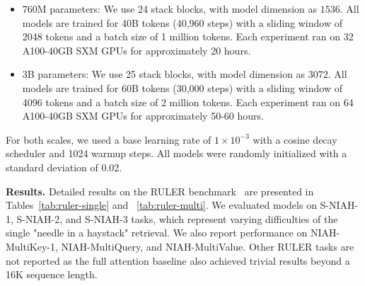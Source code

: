 \documentclass{article}
\begin{document}
\begin{itemize}
    \item 760M parameters: We use 24 stack blocks, with model dimension as $1536$. All models are trained for 40B tokens (40,960 steps) with a sliding window of 2048 tokens and a batch size of 1 million tokens. Each experiment ran on 32 A100-40GB SXM GPUs for approximately 20 hours.
    \item 3B parameters: We use 25 stack blocks, with model dimension as $3072$. All models are trained for 60B tokens (30,000 steps) with a sliding window of 4096 tokens and a batch size of 2 million tokens. Each experiment ran on 64 A100-40GB SXM GPUs for approximately 50-60 hours.
\end{itemize}
For both scales, we used a base learning rate of $1\times 10^{-3}$ 
 with a cosine decay scheduler and 1024 warmup steps. All models were randomly initialized with a standard deviation of 0.02.

\noindent\textbf{Results.} Detailed results on the RULER benchmark~\cite{hsiehruler} are presented in Tables~\ref{tab:ruler-single} and ~\ref{tab:ruler-multi}. We evaluated models on S-NIAH-1, S-NIAH-2, and S-NIAH-3 tasks, which represent varying difficulties of the single "needle in a haystack" retrieval. We also report performance on NIAH-MultiKey-1, NIAH-MultiQuery, and NIAH-MultiValue. Other RULER tasks are not reported as the full attention baseline also achieved trivial results beyond a 16K sequence length.
\end{document}

